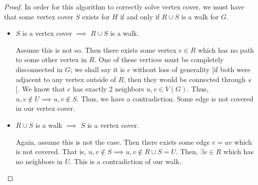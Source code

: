 \documentclass{article}
\begin{document}
\begin{proof}
    In order for this algorithm to correctly solve vertex cover, we must have that some vertex cover $S$ exists for $H$ if and only if $R \cup S$ is a walk for $G$.
    \begin{itemize}
        \item $S$ is a vertex cover $\implies$ $R \cup S$ is a walk.

        Assume this is not so.
        Then there exists some vertex $e \in R$ which has no path to some other vertex in $R$.
        One of these vertices must be completely disconnected in $G$; we shall say it is $e$ without loss of generality 
        [if both were adjacent to any vertex outside of $R$, then they would be connected through $s$].
        We know that $e$ has exactly 2 neighbors $u,v \in V(G)$.
        Thus, $u, v \not\in U \implies u, v \not\in S$.
        Thus, we have a contradiction.
        Some edge is not covered in our vertex cover.

        \item $R \cup S$ is a walk $\implies$ $S$ is a vertex cover.

        Again, assume this is not the case.
        Then there exists some edge $e = uv$ which is not covered.
        That is, $u, v \not\in S \implies u, v \not\in R \cup S = U$.
        Then, $\exists e \in R$ which has no neighbors in $U$.
        This is a contradiction of our walk.
    \end{itemize}
\end{proof}
\end{document}
